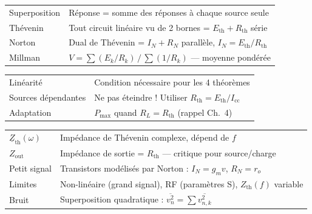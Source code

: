 \documentclass[12pt,a4paper,twoside]{book}
\begin{document}
\begin{bases}[title={\color{white} Résumé --- Les Bases}]
\begin{center}
\renewcommand{\arraystretch}{1.3}
\begin{tabular}{p{4cm}p{9cm}}
\toprule
Superposition & Réponse = somme des réponses à chaque source seule \\
Thévenin & Tout circuit linéaire vu de 2 bornes = $E_{\text{th}} + R_{\text{th}}$ série \\
Norton & Dual de Thévenin = $I_N + R_N$ parallèle, $I_N = E_{\text{th}}/R_{\text{th}}$ \\
Millman & $V = \sum(E_k/R_k) \,/\, \sum(1/R_k)$ --- moyenne pondérée \\
\bottomrule
\end{tabular}
\end{center}
\end{bases}

\begin{approfondissement}[title={\color{white} Résumé --- Approfondissement}]
\begin{center}
\renewcommand{\arraystretch}{1.3}
\begin{tabular}{p{4cm}p{9cm}}
\toprule
Linéarité & Condition nécessaire pour les 4 théorèmes \\
Sources dépendantes & Ne pas éteindre ! Utiliser $R_{\text{th}} = E_{\text{th}}/I_{\text{cc}}$ \\
Adaptation & $P_{\max}$ quand $R_L = R_{\text{th}}$ (rappel Ch.\ 4) \\
\bottomrule
\end{tabular}
\end{center}
\end{approfondissement}

\begin{ingenieur}[title={\color{white} Résumé --- Niveau Ingénieur}]
\begin{center}
\renewcommand{\arraystretch}{1.3}
\begin{tabular}{p{4cm}p{9cm}}
\toprule
$\underline{Z}_{\text{th}}(\omega)$ & Impédance de Thévenin complexe, dépend de $f$ \\
$Z_{\text{out}}$ & Impédance de sortie = $R_{\text{th}}$ --- critique pour source/charge \\
Petit signal & Transistors modélisés par Norton : $I_N = g_m v$, $R_N = r_o$ \\
Limites & Non-linéaire (grand signal), RF (paramètres S), $Z_{\text{th}}(f)$ variable \\
Bruit & Superposition quadratique : $\overline{v_n^2} = \sum \overline{v_{n,k}^2}$ \\
\bottomrule
\end{tabular}
\end{center}
\end{ingenieur}
\end{document}

